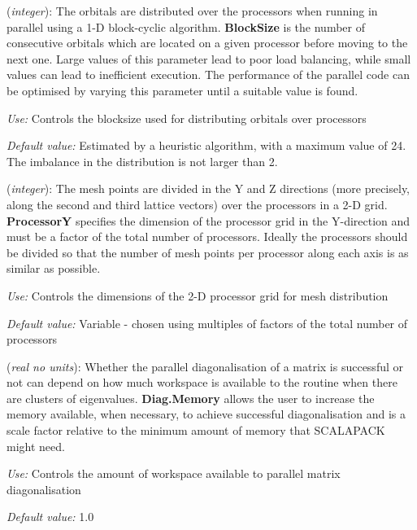 \begin{description}
\itemsep 10pt
\parsep 0pt

\item[\textbf{BlockSize}] (\textit{integer}):  The orbitals are distributed over the processors when
running in parallel using a 1-D block-cyclic algorithm. \textbf{BlockSize} is the number of consecutive orbitals which are located on
a given processor before moving to the next one. Large values of this
parameter lead to poor load balancing, while small values can lead to
inefficient execution.  The performance of the parallel code can be
optimised by varying this parameter until a suitable value is found.

\textit{Use:} Controls the blocksize used for distributing orbitals over
processors

\textit{Default value:}  Estimated by a heuristic algorithm, with a
maximum value of 24. The imbalance in the distribution is not
larger than 2.

\item[\textbf{ProcessorY}] (\textit{integer}):  The mesh points are divided in the Y and Z directions
(more precisely, along the second and third lattice vectors)
over the processors in a 2-D grid. \textbf{ProcessorY} specifies the
dimension of the processor grid in the Y-direction and must be a
factor of the total number of processors. Ideally the processors
should be divided so that the number of mesh points per processor
along each axis is as similar as possible.

\textit{Use:} Controls the dimensions of the 2-D processor grid for mesh
distribution

\textit{Default value:} Variable - chosen using multiples of factors of
  the total number of processors

\item[\textbf{Diag.Memory}] (\textit{real no units}):
Whether the parallel diagonalisation of a matrix is successful or not can
depend on how much workspace is available to the routine when there are
clusters of eigenvalues. \textbf{Diag.Memory} allows the user to increase
the memory available, when necessary, to achieve successful diagonalisation
and is a scale factor relative to the minimum amount of memory that
SCALAPACK might need.

\textit{Use:} Controls the amount of workspace available to parallel
matrix diagonalisation

\textit{Default value:}  1.0

\end{description}

